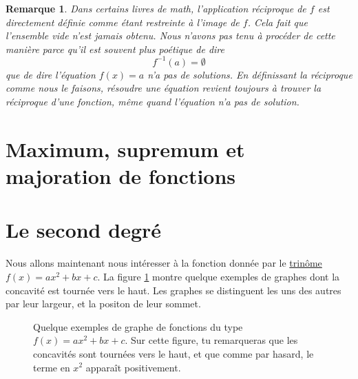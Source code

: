 \documentclass[a4paper,12pt]{book}
\newcounter{numtho}
\theoremstyle{mes_exemples}	\newtheorem{exemple}[numtho]{Exemple}
\newtheorem{remark}[numtho]{Remarque}
\theoremstyle{mes_tho}
\begin{document}
\begin{remark}
Dans certains livres de math, l'application réciproque de $f$ est directement définie comme étant restreinte à l'image de $f$. Cela fait que l'ensemble vide n'est jamais obtenu. Nous n'avons pas tenu à procéder de cette manière parce qu'il est souvent plus poétique de dire 
\[ 
  f^{-1}(a)=\emptyset
\]
que de dire \og l'équation $f(x)=a$ n'a pas de solutions\fg. En définissant la réciproque comme nous le faisons, résoudre une équation revient toujours à trouver la réciproque d'une fonction, même quand l'équation n'a pas de solution.
\end{remark}


\section{Maximum, supremum et majoration de fonctions}

\section{Le second degré}

Nous allons maintenant nous intéresser à la fonction donnée par le \href{http://fr.wikiversity.org/wiki/Cours_de_mathématiques_de_première_STI/Fonctions_polynômes_du_second_degré_(ou_trinômes)}{trinôme} $f(x)=ax^2+bx+c$. La figure \ref{figExposi} montre quelque exemples de graphes dont la concavité est tournée vers le haut. Les graphes se distinguent les uns des autres par leur largeur, et la positon de leur sommet.

\begin{figure}[ht]
\centering
{}
%
%
\caption{Quelque exemples de graphe de fonctions du type $f(x)=ax^2+bx+c$. Sur cette figure, tu remarqueras que les concavités sont tournées vers le haut, et que comme par hasard, le terme en $x^2$ apparaît positivement.}\label{figExposi}
\end{figure}
\end{document}
